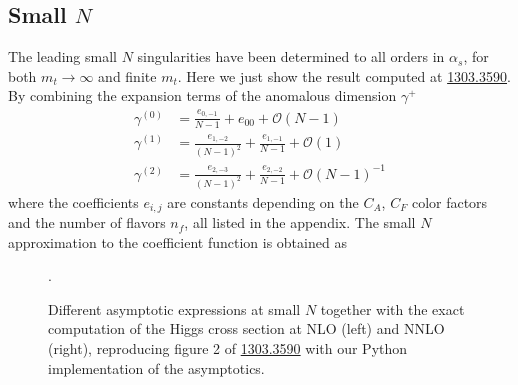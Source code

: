 \documentclass[12pt]{article}
\begin{document}
\subsection{Small $N$}
The leading small $N$ singularities have been determined to all orders in $\alpha_{s}$, for both $m_{t} \rightarrow \infty$ and finite $m_{t}$. Here we just show the result computed at \href{https://arxiv.org/abs/1303.3590}{1303.3590}. By combining the expansion terms of the anomalous dimension $\gamma^{+}$
\begin{align}
	\gamma^{(0)} &= \frac{e_{0, -1}}{N - 1} + e_{00} + \mathcal{O}(N - 1) \\
	\gamma^{(1)} &= \frac{e_{1, -2}}{(N - 1)^{2}} + \frac{e_{1, -1}}{N - 1} + \mathcal{O}(1) \\
	\gamma^{(2)} &= \frac{e_{2, -3}}{(N - 1)^{2}} + \frac{e_{2, -2}}{N - 1} + \mathcal{O}(N - 1)^{-1}
\end{align}
where the coefficients $e_{i, j}$ are constants depending on the $C_{A}$, $C_{F}$ color factors and the number of flavors $n_{f}$, all listed in the appendix. The small $N$ approximation to the coefficient function is obtained as

\begin{figure}
	\centering
	\qquad
	\caption{Different asymptotic expressions at small $N$ together with the exact computation of the Higgs cross section at NLO (left) and NNLO (right), reproducing figure 2 of \href{https://arxiv.org/abs/1303.3590}{1303.3590} with our Python implementation of the asymptotics.}.
	\label{small_n_asymptotics}
\end{figure}
\end{document}
